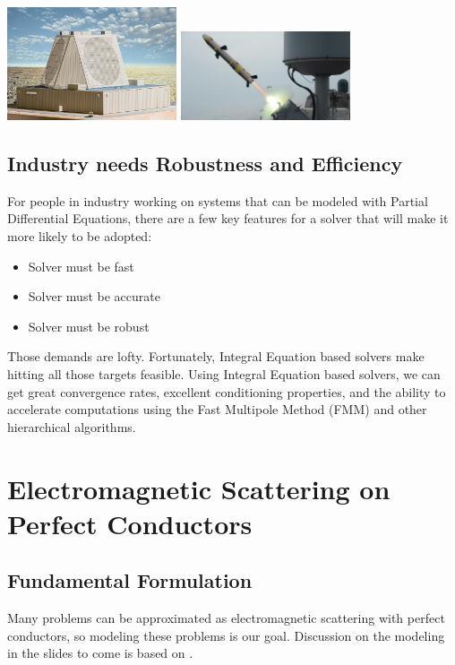 \documentclass{article}[12pt]
\begin{document}
	\vspace{0.5in}
	\hfil\hfil\includegraphics[width=5cm,frame]{raytheonRadar}\hfil\hfil
	\includegraphics[width=5cm,frame]{griffinMissile}\newline
	\null\hfil\hfil{}
	\hfil\hfil{}
	
	

	
	\subsection{Industry needs Robustness and Efficiency}
	For people in industry working on systems that can be modeled with Partial Differential Equations, there are a few key features for a solver that will make it more likely to be adopted:
	
	\begin{itemize}
		\item Solver must be fast
		\item Solver must be accurate
		\item Solver must be robust 
	\end{itemize}
	
	Those demands are lofty. Fortunately, Integral Equation based solvers make hitting all those targets feasible. Using Integral Equation based solvers, we can get great convergence rates, excellent conditioning properties, and the ability to accelerate computations using the Fast Multipole Method (FMM) and other hierarchical algorithms.
	

	
	\section{Electromagnetic Scattering on Perfect Conductors}
	\subsection{Fundamental Formulation}
	Many problems can be approximated as electromagnetic scattering with perfect conductors, so modeling these problems is our goal. Discussion on the modeling in the slides to come is based on \cite{dpie}.
	
\end{document}
